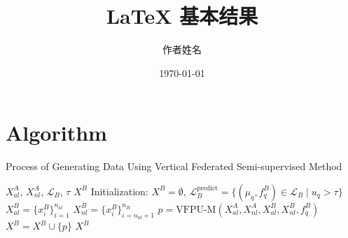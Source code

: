 \documentclass{article}  %
\begin{document}
	
	\title{LaTeX 基本结果}
	\author{作者姓名}
	\date{\today}  %
	\maketitle  %
	
	\section{Algorithm}
	
	\begin{algorithm}
		\caption{Process of Generating Data Using Vertical Federated Semi-supervised Method}
		\begin{algorithmic}[1]
			\Require $X_{al}^A$, $X_{nl}^A$, $\mathcal{L}_B$, $\tau$
			\Ensure $X^B$
			\State Initialization: $X^B = \emptyset$, $\mathcal{L}_B^{\text{predict}} = \{(\mu_q, f^B_q) \in \mathcal{L}_B \mid u_q > \tau\}$
			\State $X_{al}^{B}=\{x_{i}^{B}\}_{i=1}^{n_{al}}$
			\State $X_{nl}^{B}=\{x_{i}^{B}\}_{i=n_{al}+1}^{n_{B}}$
			\State $p = \text{VFPU-M}(X_{al}^A, X_{nl}^A, X_{al}^B, X_{nl}^B, f^B_q)$
			\State $X^{B} = X^{B} \cup \{p\}$
			\EndFor
			\Return $X^{B}$
		\end{algorithmic}
	\end{algorithm}
\end{document}
